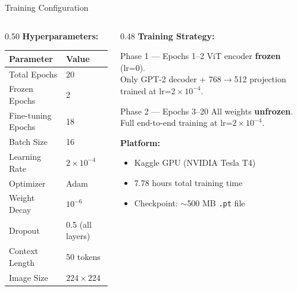 \documentclass{beamer}
\begin{document}
\begin{frame}{Training Configuration}

\begin{columns}[T]
\begin{column}{0.50\textwidth}
    \textbf{Hyperparameters:}
    \begin{center}
    \small
    \begin{tabular}{ll}
    \toprule
    \textbf{Parameter} & \textbf{Value} \\
    \midrule
    Total Epochs        & 20 \\
    Frozen Epochs       & 2  \\
    Fine-tuning Epochs  & 18 \\
    Batch Size          & 16 \\
    Learning Rate       & $2\times10^{-4}$ \\
    Optimizer           & Adam \\
    Weight Decay        & $10^{-6}$ \\
    Dropout             & 0.5 (all layers) \\
    Context Length      & 50 tokens \\
    Image Size          & $224\times224$ \\
    \bottomrule
    \end{tabular}
    \end{center}
\end{column}
\begin{column}{0.48\textwidth}
    \textbf{Training Strategy:}
    \begin{block}{Phase 1 — Epochs 1--2}
        \small ViT encoder \textbf{frozen} (lr=0).\\
        Only GPT-2 decoder + 768$\to$512 projection trained at lr=$2\times10^{-4}$.
    \end{block}
    \vspace{0.3cm}
    \begin{block}{Phase 2 — Epochs 3--20}
        \small All weights \textbf{unfrozen}.\\
        Full end-to-end training at lr=$2\times10^{-4}$.
    \end{block}
    \vspace{0.3cm}
    \textbf{Platform:}
    \begin{itemize}
        \item Kaggle GPU (NVIDIA Tesla T4)
        \item 7.78 hours total training time
        \item Checkpoint: $\sim$500 MB \texttt{.pt} file
    \end{itemize}
\end{column}
\end{columns}

\end{frame}
\end{document}
